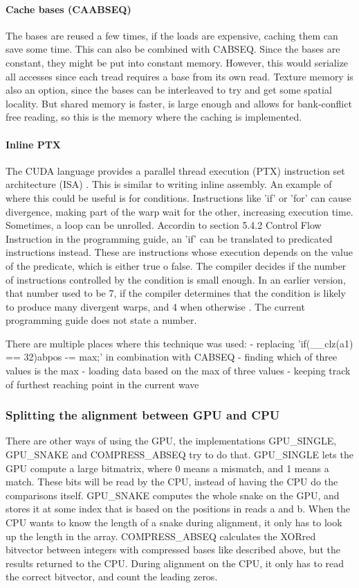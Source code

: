\documentclass[../main/thesis.tex]{subfiles}
\begin{document}
\paragraph{Cache bases (CAABSEQ)}
The bases are reused a few times, if the loads are expensive, caching them can save some time.
This can also be combined with CABSEQ.
Since the bases are constant, they might be put into constant memory.
However, this would serialize all accesses since each tread requires a base from its own read.
Texture memory is also an option, since the bases can be interleaved to try and get some spatial locality.
But shared memory is faster, is large enough and allows for bank-conflict free reading, so this is the memory where the caching is implemented.


\paragraph{Inline PTX}
The CUDA language provides a parallel thread execution (PTX) instruction set architecture (ISA) \cite{PTX1}\cite{PTX2}.
This is similar to writing inline assembly.
An example of where this could be useful is for conditions.
Instructions like 'if' or 'for' can cause divergence, making part of the warp wait for the other, increasing execution time.
Sometimes, a loop can be unrolled.
Accordin to section 5.4.2 Control Flow Instruction in the programming guide\cite{cuda}, an 'if' can be translated to predicated instructions instead.
These are instructions whose execution depends on the value of the predicate, which is either true o false.
The compiler decides if the number of instructions controlled by the condition is small enough.
In an earlier version, that number used to be 7, if the compiler determines that the condition is likely to produce many divergent warps, and 4 when otherwise \cite{PTX3}.
The current programming guide does not state a number.

There are multiple places where this technique was used:
- replacing 'if(\_\_clz(a1) == 32){abpos -= max;}' in combination with CABSEQ
- finding which of three values is the max
- loading data based on the max of three values
- keeping track of furthest reaching point in the current wave

\subsubsection{Splitting the alignment between GPU and CPU}
There are other ways of using the GPU, the implementations GPU\_SINGLE, GPU\_SNAKE and COMPRESS\_ABSEQ try to do that.
GPU\_SINGLE lets the GPU compute a large bitmatrix, where 0 means a mismatch, and 1 means a match.
These bits will be read by the CPU, instead of having the CPU do the comparisons itself.
GPU\_SNAKE computes the whole snake on the GPU, and stores it at some index that is based on the positions in reads a and b.
When the CPU wants to know the length of a snake during alignment, it only has to look up the length in the array.
COMPRESS\_ABSEQ calculates the XORred bitvector between integers with compressed bases like described above, but the results returned to the CPU.
During alignment on the CPU, it only has to read the correct bitvector, and count the leading zeros.
\end{document}
